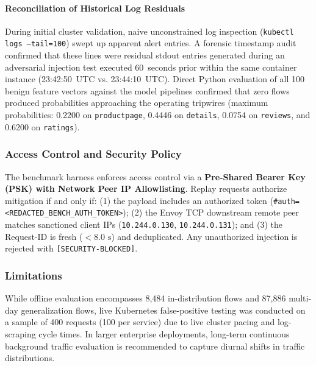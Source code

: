 \paragraph{Reconciliation of Historical Log Residuals}
During initial cluster validation, naive unconstrained log inspection (\texttt{kubectl logs --tail=100}) swept up apparent alert entries. A forensic timestamp audit confirmed that these lines were residual stdout entries generated during an adversarial injection test executed 60~seconds prior within the same container instance (23:42:50~UTC vs. 23:44:10~UTC). Direct Python evaluation of all 100 benign feature vectors against the model pipelines confirmed that zero flows produced probabilities approaching the operating tripwires (maximum probabilities: 0.2200 on \texttt{productpage}, 0.4446 on \texttt{details}, 0.0754 on \texttt{reviews}, and 0.6200 on \texttt{ratings}).

\subsubsection{Access Control and Security Policy}
The benchmark harness enforces access control via a \textbf{Pre-Shared Bearer Key (PSK) with Network Peer IP Allowlisting}. Replay requests authorize mitigation if and only if: (1) the payload includes an authorized token (\texttt{\#auth=<REDACTED\_BENCH\_AUTH\_TOKEN>}); (2) the Envoy TCP downstream remote peer matches sanctioned client IPs (\texttt{10.244.0.130}, \texttt{10.244.0.131}); and (3) the Request-ID is fresh ($< 8.0\text{ s}$) and deduplicated. Any unauthorized injection is rejected with \texttt{[SECURITY-BLOCKED]}.

\subsubsection{Limitations}
While offline evaluation encompasses 8,484 in-distribution flows and 87,886 multi-day generalization flows, live Kubernetes false-positive testing was conducted on a sample of 400 requests (100 per service) due to live cluster pacing and log-scraping cycle times. In larger enterprise deployments, long-term continuous background traffic evaluation is recommended to capture diurnal shifts in traffic distributions.
